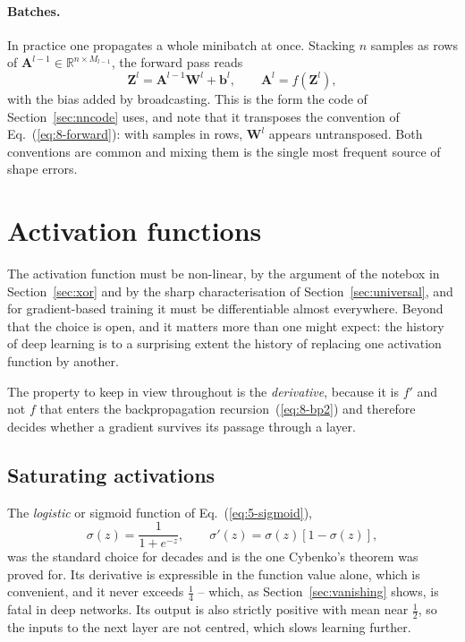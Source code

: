 \paragraph{Batches.}
In practice one propagates a whole minibatch at once.  Stacking $n$ samples as
rows of $\bm{A}^{l-1}\in\mathbb{R}^{n\times M_{l-1}}$, the forward pass reads
\begin{equation}
  \bm{Z}^{l} = \bm{A}^{l-1}\bm{W}^{l}+\bm{b}^{l},
  \qquad
  \bm{A}^{l} = f\left(\bm{Z}^{l}\right),
  \label{eq:8-forwardbatch}
\end{equation}
with the bias added by broadcasting.  This is the form the code of
Section~\ref{sec:nncode} uses, and note that it transposes the convention of
Eq.~(\ref{eq:8-forward}): with samples in rows, $\bm{W}^{l}$ appears
untransposed.  Both conventions are common and mixing them is the single most
frequent source of shape errors.

\section{Activation functions}
\label{sec:activations}

The activation function must be non-linear, by the argument of the notebox in
Section~\ref{sec:xor} and by the sharp characterisation of
Section~\ref{sec:universal}, and for gradient-based training it must be
differentiable almost everywhere.  Beyond that the choice is open, and it
matters more than one might expect: the history of deep learning is to a
surprising extent the history of replacing one activation function by another.

The property to keep in view throughout is the \emph{derivative}, because it is
$f'$ and not $f$ that enters the backpropagation recursion~(\ref{eq:8-bp2}) and
therefore decides whether a gradient survives its passage through a layer.

\subsection{Saturating activations}
\label{sec:satact}

The \emph{logistic} or sigmoid function of Eq.~(\ref{eq:5-sigmoid}),
\begin{equation}
  \sigma(z) = \frac{1}{1+e^{-z}},
  \qquad
  \sigma'(z) = \sigma(z)\left[1-\sigma(z)\right],
  \label{eq:8-sigmoid}
\end{equation}
was the standard choice for decades and is the one Cybenko's theorem was
proved for.  Its derivative is expressible in the function value alone, which
is convenient, and it never exceeds $\tfrac14$ -- which, as
Section~\ref{sec:vanishing} shows, is fatal in deep networks.  Its output is
also strictly positive with mean near $\tfrac12$, so the inputs to the next
layer are not centred, which slows learning further.

